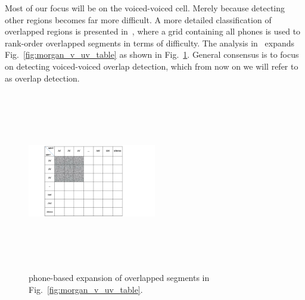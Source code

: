 Most of our focus will be on the voiced-voiced cell. 
Merely because detecting other regions becomes far more difficult. 
A more detailed classification of overlapped regions is presented in~\cite{nav_icassp13}, where a grid containing all phones is used to rank-order overlapped segments in terms of difficulty. 
The analysis in~\cite{nav_icassp13} expands Fig.~\ref{fig:morgan_v_uv_table} as shown in Fig.~\ref{fig:nav_v_uv_table}. 
General consensus is to focus on detecting voiced-voiced overlap detection, which from now on we will refer to as overlap detection. 

\begin{figure}[h!]
	\centering
	\includegraphics[height = 3.1in, width=0.5\textwidth]{figures/nav_v_uv_table}	
	\caption{phone-based expansion of overlapped segments in Fig.~\ref{fig:morgan_v_uv_table}.}
	\label{fig:nav_v_uv_table}
\end{figure}


